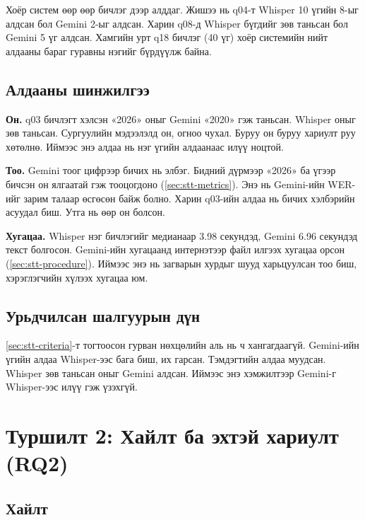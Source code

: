Хоёр систем өөр өөр бичлэг дээр алддаг. Жишээ нь q04-т Whisper 10 үгийн 8-ыг алдсан бол Gemini 2-ыг алдсан. Харин q08-д Whisper бүгдийг зөв таньсан бол Gemini 5 үг алдсан. Хамгийн урт q18 бичлэг (40 үг) хоёр системийн нийт алдааны бараг гуравны нэгийг бүрдүүлж байна.

\subsection{Алдааны шинжилгээ}
\label{sec:res-errors}

\textbf{Он.} q03 бичлэгт хэлсэн «2026» оныг Gemini «2020» гэж таньсан. Whisper оныг зөв таньсан. Сургуулийн мэдээлэлд он, огноо чухал. Буруу он буруу хариулт руу хөтөлнө. Иймээс энэ алдаа нь нэг үгийн алдаанаас илүү ноцтой.

\textbf{Тоо.} Gemini тоог цифрээр бичих нь элбэг. Бидний дүрмээр «2026» ба үгээр бичсэн он ялгаатай гэж тооцогдоно (\ref{sec:stt-metrics}). Энэ нь Gemini-ийн WER-ийг зарим талаар өсгөсөн байж болно. Харин q03-ийн алдаа нь бичих хэлбэрийн асуудал биш. Утга нь өөр он болсон.

\textbf{Хугацаа.} Whisper нэг бичлэгийг медианаар 3.98 секундэд, Gemini 6.96 секундэд текст болгосон. Gemini-ийн хугацаанд интернэтээр файл илгээх хугацаа орсон (\ref{sec:stt-procedure}). Иймээс энэ нь загварын хурдыг шууд харьцуулсан тоо биш, хэрэглэгчийн хүлээх хугацаа юм.

\subsection{Урьдчилсан шалгуурын дүн}
\label{sec:res-criteria}

\ref{sec:stt-criteria}-т тогтоосон гурван нөхцөлийн аль нь ч хангагдаагүй. Gemini-ийн үгийн алдаа Whisper-ээс бага биш, их гарсан. Тэмдэгтийн алдаа муудсан. Whisper зөв таньсан оныг Gemini алдсан. Иймээс энэ хэмжилтээр Gemini-г Whisper-ээс илүү гэж үзэхгүй.

\section{Туршилт 2: Хайлт ба эхтэй хариулт (RQ2)}
\label{sec:res-rag}

\subsection{Хайлт}
\label{sec:res-retrieval}

